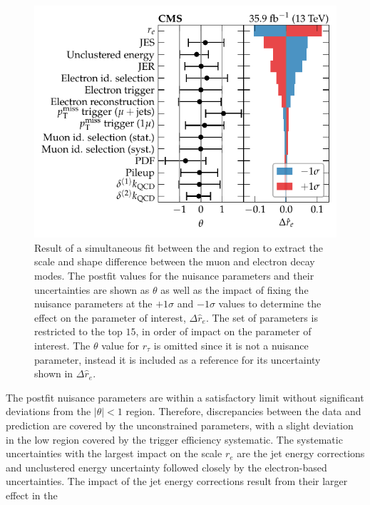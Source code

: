 \begin{figure}[htb]
    \centering
    \includegraphics{chapters/042_backgrounds/images/impacts_tfmu2ewj.pdf}
    \caption[Nuisance parameters from a simultaneous fit to the muon and electron control regions]{
        Result of a simultaneous fit between the \muplusjets and \eleplusjets region to extract the scale and shape difference between the muon and electron decay modes. The postfit values for the nuisance parameters and their uncertainties are shown as $\theta$ as well as the impact of fixing the nuisance parameters at the $+1\sigma$ and $-1\sigma$ values to determine the effect on the parameter of interest, $\Delta \hat{r}_e$. The set of parameters is restricted to the top $15$, in order of impact on the parameter of interest. The $\theta$ value for $r_\tau$ is omitted since it is not a nuisance parameter, instead it is included as a reference for its uncertainty shown in $\Delta \hat{r}_e$.
    }
    \label{fig:fit_tf_mu_e_wj_impacts}
\end{figure}
%
The postfit nuisance parameters are within a satisfactory limit without
significant deviations from the $|\theta|<1$ region. Therefore, discrepancies
between the data and prediction are covered by the unconstrained parameters,
with a slight deviation in the low \recoil \muplusjets region covered by the
\ptmiss trigger efficiency systematic. The systematic uncertainties with the largest impact
on the scale $r_e$ are the jet energy corrections and unclustered energy
uncertainty followed closely by the electron-based uncertainties. The impact
of the jet energy corrections result from their larger effect in the
